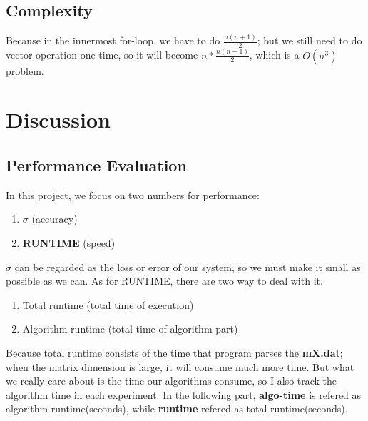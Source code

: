 \documentclass{article}
\begin{document}
\subsection{Complexity}
\label{sec:complexity}
Because in the innermost for-loop, we have to do $\frac{n(n+1)}{2}$; but we still need to do vector operation one time, so it will
become $n * \frac{n(n+1)}{2}$, which is a \boldmath$O(n^3)$ problem.

\section{Discussion}
\subsection{Performance Evaluation}
In this project, we focus on two numbers for performance:
\begin{enumerate}
    \item \boldmath$\sigma$ (accuracy) \\
    \item \textbf{RUNTIME} (speed)
\end{enumerate}

$\sigma$ can be regarded as the loss or error of our system, so we must make it small as possible as we can. As for RUNTIME, there are
two way to deal with it.
\begin{enumerate}
    \item Total runtime (total time of execution) \\
    \item Algorithm runtime (total time of algorithm part)
\end{enumerate}
Because total runtime consists of the time that program parses the \textbf{mX.dat}; when the matrix dimension is large, it will consume
much more time. But what we really care about is the time our algorithms consume, so I also track the algorithm time in each 
experiment. In the following part, \textbf{algo-time} is refered as algorithm runtime(seconds), 
while \textbf{runtime} refered as total runtime(seconds).
\end{document}
